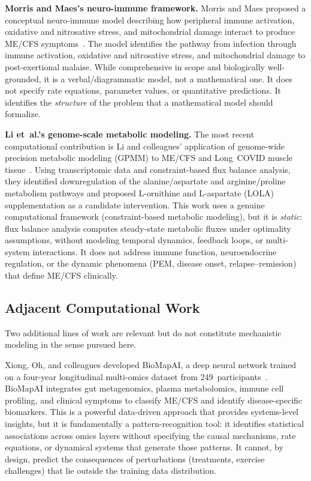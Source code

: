 \textbf{Morris and Maes's neuro-immune framework.} Morris and Maes proposed a conceptual neuro-immune model describing how peripheral immune activation, oxidative and nitrosative stress, and mitochondrial damage interact to produce ME/CFS symptoms~\cite{morris2013neuroimmune}. The model identifies the pathway from infection through immune activation, oxidative and nitrosative stress, and mitochondrial damage to post-exertional malaise. While comprehensive in scope and biologically well-grounded, it is a verbal/diagrammatic model, not a mathematical one. It does not specify rate equations, parameter values, or quantitative predictions. It identifies the \emph{structure} of the problem that a mathematical model should formalize.

\textbf{Li et~al.'s genome-scale metabolic modeling.} The most recent computational contribution is Li and colleagues' application of genome-wide precision metabolic modeling (GPMM) to ME/CFS and Long~COVID muscle tissue~\cite{li2025systems}. Using transcriptomic data and constraint-based flux balance analysis, they identified downregulation of the alanine/aspartate and arginine/proline metabolism pathways and proposed L-ornithine and L-aspartate (LOLA) supplementation as a candidate intervention. This work uses a genuine computational framework (constraint-based metabolic modeling), but it is \emph{static}: flux balance analysis computes steady-state metabolic fluxes under optimality assumptions, without modeling temporal dynamics, feedback loops, or multi-system interactions. It does not address immune function, neuroendocrine regulation, or the dynamic phenomena (PEM, disease onset, relapse--remission) that define ME/CFS clinically.

\subsection{Adjacent Computational Work}
\label{sec:adjacent-work}

Two additional lines of work are relevant but do not constitute mechanistic modeling in the sense pursued here.

Xiong, Oh, and colleagues developed BioMapAI, a deep neural network trained on a four-year longitudinal multi-omics dataset from 249~participants~\cite{xiong2025biomap}. BioMapAI integrates gut metagenomics, plasma metabolomics, immune cell profiling, and clinical symptoms to classify ME/CFS and identify disease-specific biomarkers. This is a powerful data-driven approach that provides systems-level insights, but it is fundamentally a pattern-recognition tool: it identifies statistical associations across omics layers without specifying the causal mechanisms, rate equations, or dynamical systems that generate those patterns. It cannot, by design, predict the consequences of perturbations (treatments, exercise challenges) that lie outside the training data distribution.

